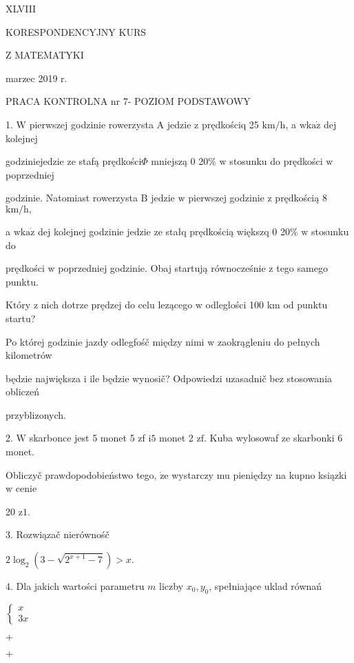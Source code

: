 \documentclass[a4paper,12pt]{article}
\begin{document}
XLVIII

KORESPONDENCYJNY KURS

Z MATEMATYKI

marzec 2019 r.

PRACA KONTROLNA nr 7- POZIOM PODSTAWOWY

1. $\mathrm{W}$ pierwszej godzinie rowerzysta A jedzie $\mathrm{z}$ prędkościq 25 $\mathrm{k}\mathrm{m}/\mathrm{h}$, a $\mathrm{w}\mathrm{k}\mathrm{a}\dot{\mathrm{z}}$ dej kolejnej

godziniejedzie ze stafą prędkości$\Phi$ mniejszą $0$ 20\% $\mathrm{w}$ stosunku do prędkości $\mathrm{w}$ poprzedniej

godzinie. Natomiast rowerzysta $\mathrm{B}$ jedzie $\mathrm{w}$ pierwszej godzinie $\mathrm{z}$ prędkością 8 $\mathrm{k}\mathrm{m}/\mathrm{h},$

a $\mathrm{w}\mathrm{k}\mathrm{a}\dot{\mathrm{z}}$ dej kolejnej godzinie jedzie ze stałq prędkością większq $0$ 20\% $\mathrm{w}$ stosunku do

prędkości $\mathrm{w}$ poprzedniej godzinie. Obaj startują równocześnie $\mathrm{z}$ tego samego punktu.

Który $\mathrm{z}$ nich dotrze prędzej do celu lezącego $\mathrm{w}$ odleglości 100 km od punktu startu?

Po której godzinie jazdy odlegfośč między nimi $\mathrm{w}$ zaokrągleniu do pełnych kilometrów

będzie największa $\mathrm{i}$ ile będzie wynosič? Odpowiedzi uzasadnič bez stosowania obliczeń

przyblizonych.

2. $\mathrm{W}$ skarbonce jest 5 monet 5 zf $\mathrm{i}5$ monet 2 $\mathrm{z}\mathrm{f}$. Kuba wylosowaf ze skarbonki 6 monet.

Obliczyč prawdopodobieństwo tego, $\dot{\mathrm{z}}\mathrm{e}$ wystarczy mu pieniędzy na kupno ksiązki $\mathrm{w}$ cenie

20 $\mathrm{z}1.$

3. Rozwiązač nierównośč

$2\log_{2}(3-\sqrt{2^{x+1}-7})>x.$

4. Dla jakich wartości parametru $m$ liczby $x_{0}, y_{0}$, spełniające uklad równań

$\left\{\begin{array}{l}
x\\
3x
\end{array}\right.$

$+$

$+$
\end{document}
